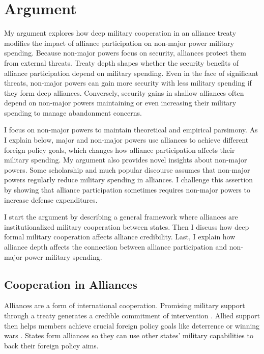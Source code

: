 \documentclass[12pt]{article}
\begin{document}
\section{Argument}

My argument explores how deep military cooperation in an alliance treaty modifies the impact of alliance participation on non-major power military spending.
Because non-major powers focus on security, alliances protect them from external threats. 
Treaty depth shapes whether the security benefits of alliance participation depend on military spending. 
Even in the face of significant threats, non-major powers can gain more security with less military spending if they form deep alliances. 
Conversely, security gains in shallow alliances often depend on non-major powers maintaining or even increasing their military spending to manage abandonment concerns. 


I focus on non-major powers to maintain theoretical and empirical parsimony.
As I explain below, major and non-major powers use alliances to achieve different foreign policy goals, which changes how alliance participation affects their military spending. 
My argument also provides novel insights about non-major powers.  
Some scholarship and much popular discourse assumes that non-major powers regularly reduce military spending in alliances.
I challenge this assertion by showing that alliance participation sometimes requires non-major powers to increase defense expenditures. 


I start the argument by describing a general framework where alliances are institutionalized military cooperation between states. 
Then I discuss how deep formal military cooperation affects alliance credibility. 
Last, I explain how alliance depth affects the connection between alliance participation and non-major power military spending. 


\subsection{Cooperation in Alliances}

Alliances are a form of international cooperation. 
Promising military support through a treaty generates a credible commitment of intervention \citep{Fearon1997, Morrow2000}. 
Allied support then helps members achieve crucial foreign policy goals like deterrence or winning wars \citep{Walt1990, Snyder1997}. 
States form alliances so they can use other states' military capabilities to back their foreign policy aims.
\end{document}
